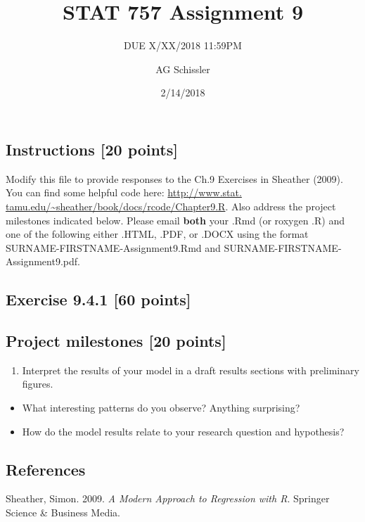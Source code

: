 \documentclass[]{article}
\title{STAT 757 Assignment 9}
\subtitle{DUE X/XX/2018 11:59PM}
\author{AG Schissler}
\date{2/14/2018}
\providecommand{\tightlist}{%
  \setlength{\itemsep}{0pt}\setlength{\parskip}{0pt}}
\begin{document}
\maketitle

\hypertarget{instructions-20-points}{%
\subsection{Instructions {[}20 points{]}}\label{instructions-20-points}}

Modify this file to provide responses to the Ch.9 Exercises in Sheather
(2009). You can find some helpful code here:
\href{http://www.stat.tamu.edu/~sheather/book/docs/rcode/Chapter9.R}{http://www.stat.
tamu.edu/\textasciitilde{}sheather/book/docs/rcode/Chapter9.R}. Also
address the project milestones indicated below. Please email
\textbf{both} your .Rmd (or roxygen .R) and one of the following either
.HTML, .PDF, or .DOCX using the format SURNAME-FIRSTNAME-Assignment9.Rmd
and SURNAME-FIRSTNAME-Assignment9.pdf.

\hypertarget{exercise-9.4.1-60-points}{%
\subsection{Exercise 9.4.1 {[}60
points{]}}\label{exercise-9.4.1-60-points}}

\hypertarget{project-milestones-20-points}{%
\subsection{Project milestones {[}20
points{]}}\label{project-milestones-20-points}}

\begin{enumerate}
\def\labelenumi{\arabic{enumi}.}
\tightlist
\item
  Interpret the results of your model in a draft results sections with
  preliminary figures.
\end{enumerate}

\begin{itemize}
\tightlist
\item
  What interesting patterns do you observe? Anything surprising?
\item
  How do the model results relate to your research question and
  hypothesis?
\end{itemize}

\hypertarget{references}{%
\subsection*{References}\label{references}}

\hypertarget{refs}{}
\leavevmode\hypertarget{ref-sheather2009}{}%
Sheather, Simon. 2009. \emph{A Modern Approach to Regression with R}.
Springer Science \& Business Media.
\end{document}
